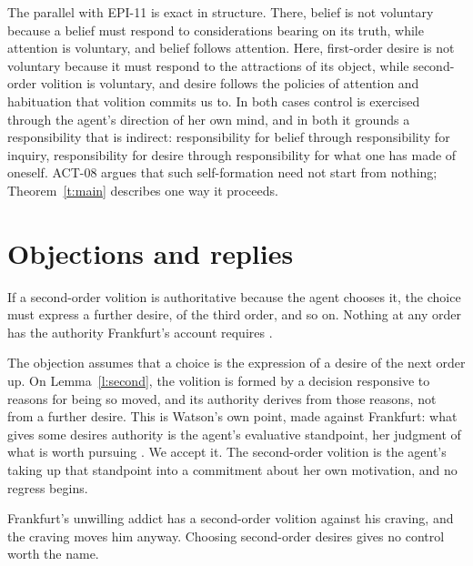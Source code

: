 \documentclass{situationist-preprint}
\begin{document}
The parallel with EPI-11 is exact in structure. There, belief is not voluntary because a belief must respond to considerations bearing on its truth, while attention is voluntary, and belief follows attention. Here, first-order desire is not voluntary because it must respond to the attractions of its object, while second-order volition is voluntary, and desire follows the policies of attention and habituation that volition commits us to. In both cases control is exercised through the agent's direction of her own mind, and in both it grounds a responsibility that is indirect: responsibility for belief through responsibility for inquiry, responsibility for desire through responsibility for what one has made of oneself. ACT-08 argues that such self-formation need not start from nothing; Theorem~\ref{t:main} describes one way it proceeds.

\section{Objections and replies}

\begin{objection}[Regress]
If a second-order volition is authoritative because the agent chooses it, the choice must express a further desire, of the third order, and so on. Nothing at any order has the authority Frankfurt's account requires \citep{Watson1975}.
\end{objection}

\begin{reply}
The objection assumes that a choice is the expression of a desire of the next order up. On Lemma~\ref{l:second}, the volition is formed by a decision responsive to reasons for being so moved, and its authority derives from those reasons, not from a further desire. This is Watson's own point, made against Frankfurt: what gives some desires authority is the agent's evaluative standpoint, her judgment of what is worth pursuing \citep{Watson1975}. We accept it. The second-order volition is the agent's taking up that standpoint into a commitment about her own motivation, and no regress begins.
\end{reply}

\begin{objection}
Frankfurt's unwilling addict has a second-order volition against his craving, and the craving moves him anyway. Choosing second-order desires gives no control worth the name.
\end{objection}
\end{document}
